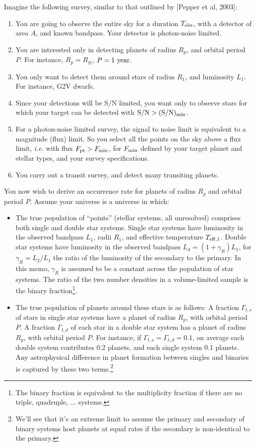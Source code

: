 \documentclass{emulateapj}
\begin{document}
Imagine the following survey, similar to that outlined by [Pepper et al, 2003]:
\begin{enumerate}
\item You are going to observe the entire sky for a duration $T_{\rm obs}$, 
with a detector of area $A$, and known bandpass. Your detector is photon-noise 
limited.
%
\item You are interested only in detecting planets of radius $R_p$, and orbital 
period $P$. For instance, $R_p=R_\oplus$, $P={\rm 1\ year}$.
%
\item You only want to detect them around stars of radius $R_1$, and luminosity 
$L_1$. For instance, G2V dwarfs.
%
\item Since your detections will be S/N limited, you want only to observe stars 
for which your target can be detected with ${\rm S/N} > {\rm (S/N)_{min}}$.
%
\item For a photon-noise limited survey, the signal to noise limit is 
equivalent to a magnitude (flux) limit. So you select all the points on the sky 
above a flux limit, \textit{i.e.} with flux $F_{\rm pt} > F_{\rm min}$, for 
$F_{\rm min}$ defined by your target planet and stellar types, and your survey 
specifications.
%
\item You carry out a transit survey, and detect many transiting planets.
\end{enumerate}

You now wish to derive an occurrence rate for planets of radius $R_p$ and 
orbital period $P$.
Assume your universe is a universe in which:
\begin{itemize}
\item The true population of ``points'' (stellar systems, all unresolved) 
	comprises both single and double star systems. Single star systems have 
	luminosity in the observed bandpass $L_1$, radii $R_1$, and effective 
	temperature $T_{\rm eff,1}$.
	Double star systems have luminosity in the observed bandpass $L_d = 
	(1+\gamma_R)L_1$, for $\gamma_R = L_2/L_1$ the ratio of the luminosity of 
	the secondary to the primary. 
  In this memo, $\gamma_R$ is assumed to be a constant across the population of
  star systems.
  The ratio of the two number densities in a 
	volume-limited sample is the binary fraction\footnote{The binary fraction 
	is equivalent to the multiplicity fraction if there are no triple, 
	quadruple, $\ldots$ systems.}.
\item The true population of planets around these stars is as follows:
	\subitem A fraction $\Gamma_{t,s}$ of stars in single star systems 
	have a planet of radius $R_p$, with orbital period $P$.
	\subitem A fraction $\Gamma_{t,d}$ of each star in a double star 
	system has a planet of radius $R_p$, with orbital period $P$. For instance, 
	if $\Gamma_{t,s} = \Gamma_{t,d} = 0.1$, on average each double 
	system contributes 0.2 planets, and each single system 0.1 planets.
    Any astrophysical difference in planet formation between singles and 
    binaries is captured by these two terms.\footnote{We'll see that it's 
    an extreme limit to assume the primary and secondary of binary systems host 
    planets at equal rates if the secondary is non-identical to the primary.}
\end{itemize}
\end{document}
